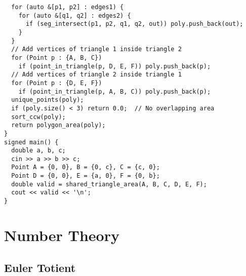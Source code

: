 \documentclass[twoside]{article}
\begin{document}
\begin{multicols*}{2}
\begin{verbatim}
  for (auto &[p1, p2] : edges1) {
    for (auto &[q1, q2] : edges2) {
      if (seg_intersect(p1, p2, q1, q2, out)) poly.push_back(out);
    }
  }
  // Add vertices of triangle 1 inside triangle 2
  for (Point p : {A, B, C})
    if (point_in_triangle(p, D, E, F)) poly.push_back(p);
  // Add vertices of triangle 2 inside triangle 1
  for (Point p : {D, E, F})
    if (point_in_triangle(p, A, B, C)) poly.push_back(p);
  unique_points(poly);
  if (poly.size() < 3) return 0.0;  // No overlapping area
  sort_ccw(poly);
  return polygon_area(poly);
}
signed main() {
  double a, b, c;
  cin >> a >> b >> c;
  Point A = {0, 0}, B = {0, c}, C = {c, 0};
  Point D = {0, 0}, E = {a, 0}, F = {0, b};
  double valid = shared_triangle_area(A, B, C, D, E, F);
  cout << valid << '\n';
}
\end{verbatim}

{
\section*{Number Theory}
}
{
\subsection*{Euler Totient}
}
\begin{verbatim}


\end{verbatim}
\end{multicols*}
\end{document}
